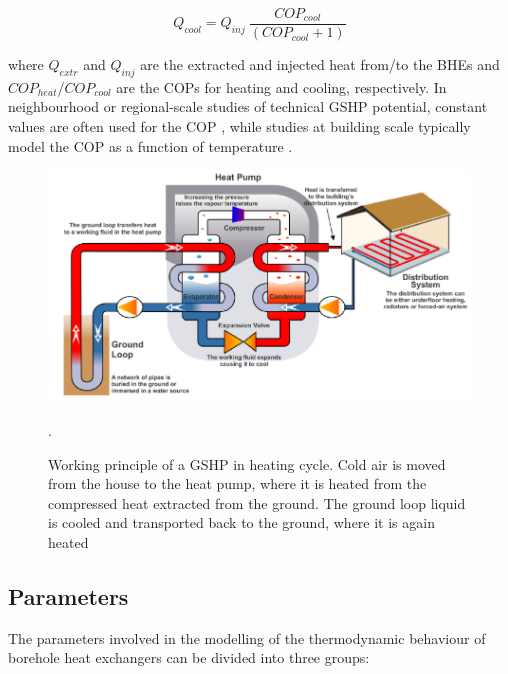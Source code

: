 \begin{equation}
\label{eq:COP_cool}
Q_\mathit{cool}=Q_\mathit{inj}\ \frac{COP_\mathit{cool}}{\left(COP_\mathit{cool}+1\right)}
\end{equation}

where $Q_\mathit{extr}$ and $Q_\mathit{inj}$ are the extracted and injected heat from/to the BHEs and $COP_\mathit{heat}$/$COP_\mathit{cool}$ are the COPs for heating and cooling, respectively. In neighbourhood or regional-scale studies of technical GSHP potential, constant values are often used for the COP \cite{miglani_methodology_2018,schiel_gis-based_2016,perego_techno-economic_2019}, while studies at building scale typically model the COP as a function of temperature \cite{fraga_heat_2018,liu_feasibility_2017,stene_residential_2005}.

\begin{figure}[bt]
    \centering
    \includegraphics[width=0.7\linewidth]{images/Figs/GSHP.png}
    \caption{Working principle of a GSHP in heating cycle. Cold air is moved from the house to the heat pump, where it is heated from the compressed heat extracted from the ground. The ground loop liquid is cooled and transported back to the ground, where it is again heated \cite{gns_science_nz_geothermal_2016}}.
    \label{fig:HP}
\end{figure}

\subsection{Parameters}
\label{geo_params}
The parameters involved in the modelling of the thermodynamic behaviour of borehole heat exchangers can be divided into three groups: 

